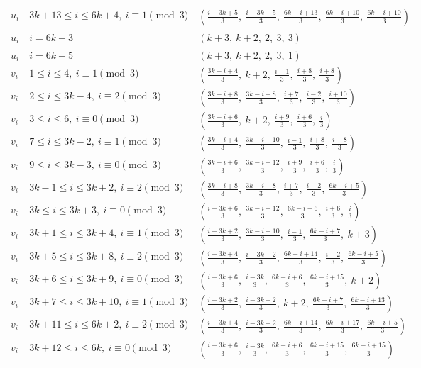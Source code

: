 \begin{longtable}{lll}
$u_i$ & $3k+13 \le i \le 6k+4,\ i \equiv 1 \pmod{3}$ & $(\frac{i-3k+5}{3},\ \frac{i-3k+5}{3},\ \frac{6k-i+13}{3},\ \frac{6k-i+10}{3},\ \frac{6k-i+10}{3})$ \\
$u_i$ & $i = 6k+3$ & $(k+3,\ k+2,\ 2,\ 3,\ 3)$ \\
$u_i$ & $i = 6k+5$ & $(k+3,\ k+2,\ 2,\ 3,\ 1)$ \\
$v_i$ & $1 \le i \le 4,\ i \equiv 1 \pmod{3}$ & $(\frac{3k-i+4}{3},\ k+2,\ \frac{i-1}{3},\ \frac{i+8}{3},\ \frac{i+8}{3})$ \\
$v_i$ & $2 \le i \le 3k-4,\ i \equiv 2 \pmod{3}$ & $(\frac{3k-i+8}{3},\ \frac{3k-i+8}{3},\ \frac{i+7}{3},\ \frac{i-2}{3},\ \frac{i+10}{3})$ \\
$v_i$ & $3 \le i \le 6,\ i \equiv 0 \pmod{3}$ & $(\frac{3k-i+6}{3},\ k+2,\ \frac{i+9}{3},\ \frac{i+6}{3},\ \frac{i}{3})$ \\
$v_i$ & $7 \le i \le 3k-2,\ i \equiv 1 \pmod{3}$ & $(\frac{3k-i+4}{3},\ \frac{3k-i+10}{3},\ \frac{i-1}{3},\ \frac{i+8}{3},\ \frac{i+8}{3})$ \\
$v_i$ & $9 \le i \le 3k-3,\ i \equiv 0 \pmod{3}$ & $(\frac{3k-i+6}{3},\ \frac{3k-i+12}{3},\ \frac{i+9}{3},\ \frac{i+6}{3},\ \frac{i}{3})$ \\
$v_i$ & $3k-1 \le i \le 3k+2,\ i \equiv 2 \pmod{3}$ & $(\frac{3k-i+8}{3},\ \frac{3k-i+8}{3},\ \frac{i+7}{3},\ \frac{i-2}{3},\ \frac{6k-i+5}{3})$ \\
$v_i$ & $3k \le i \le 3k+3,\ i \equiv 0 \pmod{3}$ & $(\frac{i-3k+6}{3},\ \frac{3k-i+12}{3},\ \frac{6k-i+6}{3},\ \frac{i+6}{3},\ \frac{i}{3})$ \\
$v_i$ & $3k+1 \le i \le 3k+4,\ i \equiv 1 \pmod{3}$ & $(\frac{i-3k+2}{3},\ \frac{3k-i+10}{3},\ \frac{i-1}{3},\ \frac{6k-i+7}{3},\ k+3)$ \\
$v_i$ & $3k+5 \le i \le 3k+8,\ i \equiv 2 \pmod{3}$ & $(\frac{i-3k+4}{3},\ \frac{i-3k-2}{3},\ \frac{6k-i+14}{3},\ \frac{i-2}{3},\ \frac{6k-i+5}{3})$ \\
$v_i$ & $3k+6 \le i \le 3k+9,\ i \equiv 0 \pmod{3}$ & $(\frac{i-3k+6}{3},\ \frac{i-3k}{3},\ \frac{6k-i+6}{3},\ \frac{6k-i+15}{3},\ k+2)$ \\
$v_i$ & $3k+7 \le i \le 3k+10,\ i \equiv 1 \pmod{3}$ & $(\frac{i-3k+2}{3},\ \frac{i-3k+2}{3},\ k+2,\ \frac{6k-i+7}{3},\ \frac{6k-i+13}{3})$ \\
$v_i$ & $3k+11 \le i \le 6k+2,\ i \equiv 2 \pmod{3}$ & $(\frac{i-3k+4}{3},\ \frac{i-3k-2}{3},\ \frac{6k-i+14}{3},\ \frac{6k-i+17}{3},\ \frac{6k-i+5}{3})$ \\
$v_i$ & $3k+12 \le i \le 6k,\ i \equiv 0 \pmod{3}$ & $(\frac{i-3k+6}{3},\ \frac{i-3k}{3},\ \frac{6k-i+6}{3},\ \frac{6k-i+15}{3},\ \frac{6k-i+15}{3})$ \\

\end{longtable}
